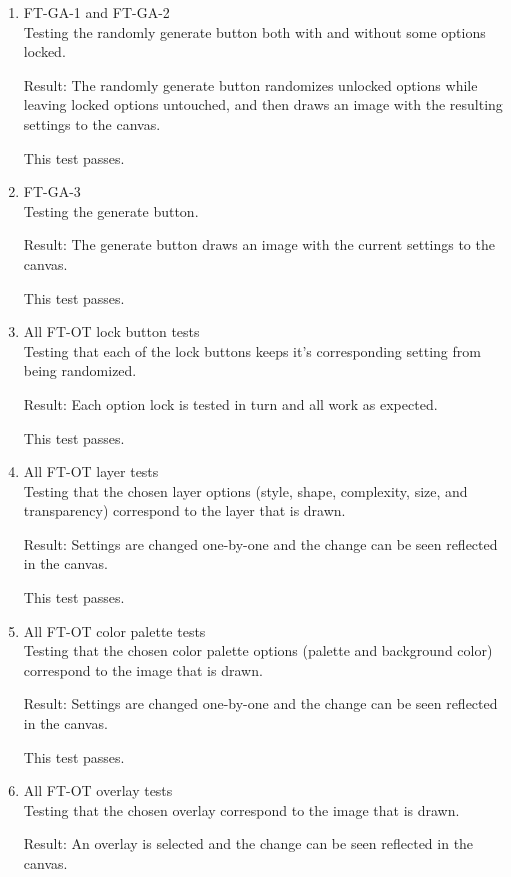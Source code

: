 \documentclass[12pt, titlepage]{article}
\begin{document}
\begin{enumerate}

\item{FT-GA-1 and FT-GA-2\\}
Testing the randomly generate button both with and without some options locked.

Result: The randomly generate button randomizes unlocked options while leaving locked options untouched, and then draws an image with the resulting settings to the canvas.

This test passes.

\item{FT-GA-3\\}
Testing the generate button.

Result: The generate button draws an image with the current settings to the canvas.

This test passes.

\item{All FT-OT lock button tests\\}
Testing that each of the lock buttons keeps it's corresponding setting from being randomized.

Result: Each option lock is tested in turn and all work as expected.

This test passes.

\item{All FT-OT layer tests\\}
Testing that the chosen layer options (style, shape, complexity, size, and transparency) correspond to the layer that is drawn.

Result: Settings are changed one-by-one and the change can be seen reflected in the canvas.

This test passes.

\item{All FT-OT color palette tests\\}
Testing that the chosen color palette options (palette and background color) correspond to the image that is drawn.

Result: Settings are changed one-by-one and the change can be seen reflected in the canvas.

This test passes.

\item{All FT-OT overlay tests\\}
Testing that the chosen overlay correspond to the image that is drawn.

Result: An overlay is selected and the change can be seen reflected in the canvas.


\end{enumerate}
\end{document}
